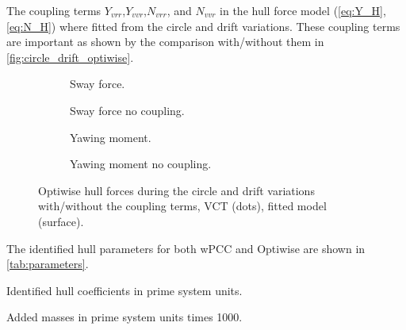 The coupling terms $Y_{vrr}$,$Y_{vvr}$,$N_{vrr}$, and $N_{vvr}$ in the hull force model (\autoref{eq:Y_H}, \autoref{eq:N_H}) where fitted from the circle and drift variations. These coupling terms are important as shown by the comparison with/without them in \autoref{fig:circle_drift_optiwise}.
\begin{figure}[h]
     \centering
     \begin{subfigure}[b]{0.49\textwidth}
         \centering
         
        \caption{Sway force.}
        \label{fig:circle_drift_Y_H_optiwise}
     \end{subfigure}
     \hfill
     \begin{subfigure}[b]{0.49\textwidth}
         \centering
         
        \caption{Sway force no coupling.}
        \label{fig:circle_drift_Y_H_no_coupling_optiwise}
     \end{subfigure}

     \vfill
     \begin{subfigure}[b]{0.49\textwidth}
         \centering
         
        \caption{Yawing moment.}
        \label{fig:circle_drift_N_H_optiwise}
     \end{subfigure}
     \hfill
     \begin{subfigure}[b]{0.49\textwidth}
         \centering
         
        \caption{Yawing moment no coupling.}
        \label{fig:circle_drift_N_H_no_coupling_optiwise}
     \end{subfigure}
     
    \caption{Optiwise hull forces during the circle and drift variations with/without the coupling terms, VCT (dots), fitted model (surface).}
    \label{fig:circle_drift_optiwise}
\end{figure}

The identified hull parameters for both wPCC and Optiwise are shown in \autoref{tab:parameters}.
\begin{table}[h]
    \centering
    \caption{Identified hull coefficients in prime system units.}
    \label{tab:parameters}
\end{table}
\begin{table}[h]
    \centering
    \caption{Added masses in prime system units times 1000.}
    \label{tab:added_masses}
\end{table}